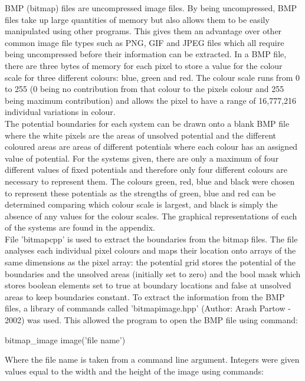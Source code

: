 BMP (bitmap) files are uncompressed image files. By being uncompressed, BMP files take up large quantities of memory but also allows them to be easily manipulated  using other programs. This gives them an advantage over other common image file types such as PNG, GIF and JPEG files which all require being uncompressed before their information can be extracted. In a BMP file, there are three bytes of memory for each pixel to store a value for the colour scale for three different colours: blue, green and red. The colour scale runs from 0 to 255 (0 being no contribution from that colour to the pixels colour and 255 being maximum contribution) and allows the pixel to have a range of 16,777,216 individual variations in colour.
\\
The potential boundaries for each system can be drawn onto a blank BMP file where the white pixels are the areas of unsolved potential and the different coloured areas are areas of different potentials where each colour has an assigned value of potential. For the systems given, there are only a maximum of four different values of fixed potentials and therefore only four different colours are necessary to represent them. The colours green, red, blue and black were chosen to represent these potentials as the strengths of green, blue and red can be determined comparing which colour scale is largest, and black is simply the absence of any values for the colour scales. The graphical representations of each of the systems are found in the appendix.
\\
File 'bitmap\textunderscore cpp' is used to extract the boundaries from the bitmap files. The file analyses each individual pixel colours and maps their location onto arrays of the same dimensions as the pixel array: the potential grid stores the potential of the boundaries and the unsolved areas (initially set to zero) and the bool mask which stores boolean elements set to true at boundary locations and false at unsolved areas to keep boundaries constant. To extract the information from the BMP files, a library of commands called 'bitmap\textunderscore image.hpp' (Author:  Arash Partow - 2002) was used. This allowed the program to open the BMP file using command:
\begin{listing}
bitmap_image image('file name')
\end{listing}
Where the file name is taken from a command line argument. Integers were given values equal to the width and the height of the image using commands:
\begin{listing}}
int height = image.height(), width = image.width()|
\end{listing}
